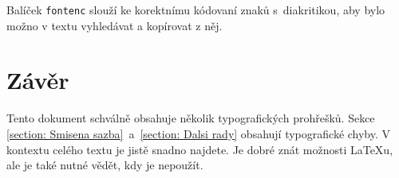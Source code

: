 \documentclass[10pt, a4paper, twocolumn]{article}
\begin{document}
Balíček {\texttt{fontenc}} slouží ke korektnímu kódovaní znaků s~diakritikou, aby bylo možno v textu vyhledávat a kopírovat z něj.

\section{Závěr}
Tento dokument schválně obsahuje několik typografických prohřešků.
Sekce \ref{section: Smisena sazba}~a~\ref{section: Dalsi rady} obsahují typografické chyby.
V kontextu celého textu je jistě snadno najdete.
Je dobré znát možnosti \LaTeX u, ale je také nutné vědět, kdy je nepoužít.
\end{document}
